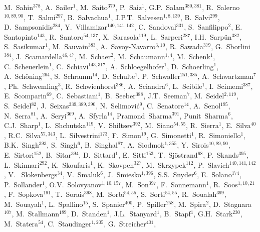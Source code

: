 M.~Sahin$^{{378}}$,
A.~Sailer$^{{1}}$,
M.~Saito$^{{379}}$,
P.~Saiz$^{{1}}$,
G.P.~Salam$^{{380, 381}}$,
R.~Salerno$^{{10, 89, 90}}$,
T.~Salmi$^{{297}}$,
B.~Salvachua$^{{1}}$,
J.P.T.~Salvesen$^{{1, 8, 139}}$,
B.~Salvi$^{{299}}$,
D.~Sampsonidis$^{{284}}$,
Y.~Villamizar$^{{140, 141, 142}}$,
C.~Sandoval$^{{331}}$,
S.~Sanfilippo$^{{2}}$,
E.~ Santopinto$^{{143}}$,
R.~Santoro$^{{54, 137}}$,
X.~Sarasola$^{{119}}$,
L.~Sarperi$^{{287}}$,
I.H.~Sarp{\"u}n$^{{382}}$,
S.~Sasikumar$^{{1}}$,
M.~Sauvain$^{{383}}$,
A.~Savoy-Navarro$^{{3, 10}}$,
R.~Sawada$^{{379}}$,
G.~Sborlini$^{{384}}$,
J.~Scamardella$^{{46, 47}}$,
M.~Schaer$^{{2}}$,
M.~Schaumann$^{{1, 4}}$,
M.~Schenk$^{{1}}$,
C.~Scheuerlein$^{{1}}$,
C.~Schiavi$^{{143, 317}}$,
A.~Schloegelhofer$^{{1}}$,
D.~Schoerling$^{{1}}$,
A.~Sch{\"o}ning$^{{264}}$,
S.~Schramm$^{{14}}$,
D.~Schulte$^{{1}}$,
P.~Schwaller$^{{251, 385}}$,
A.~Schwartzman$^{{7}}$,
Ph.~Schwemling$^{{3}}$,
R.~Schwienhorst$^{{386}}$,
A.~Sciandra$^{{6}}$,
L.~Scibile$^{{1}}$,
I.~Scimemi$^{{387}}$,
E.~Scomparin$^{{69}}$,
C.~Sebastiani$^{{1}}$,
B.~Seeber$^{{388}}$,
J.T.~Seeman$^{{7}}$,
M.~Seidel$^{{2, 119}}$,
S.~Seidel$^{{82}}$,
J.~Seixas$^{{339, 389, 390}}$,
N.~Selimovi{\'c}$^{{9}}$,
C.~Senatore$^{{14}}$,
A.~Senol$^{{195}}$,
N.~Serra$^{{81}}$,
A.~Seryi$^{{369}}$,
A.~Sfyrla$^{{14}}$,
Pramond~Sharma$^{{391}}$,
Punit~Sharma$^{{6}}$,
C.J.~Sharp$^{{1}}$,
L.~Shchutska$^{{119}}$,
V.~Shiltsev$^{{392}}$,
M.~Siano$^{{54, 55}}$,
R.~Sierra$^{{1}}$,
E.~Silva$^{{40}}$,
R.C.~Silva$^{{57, 343}}$,
L.~Silvestrini$^{{173}}$,
F.~Simon$^{{19}}$,
G.~Simonetti$^{{1}}$,
R.~Simoniello$^{{1}}$,
B.K.~Singh$^{{393}}$,
S.~Singh$^{{6}}$,
B.~Singhal$^{{87}}$,
A.~Siodmok$^{{1, 355}}$,
Y.~Sirois$^{{10, 89, 90}}$,
E.~Sirtori$^{{152}}$,
B.~Sitar$^{{394}}$,
D.~Sittard$^{{1}}$,
E.~Sitti$^{{153}}$,
T.~Sj{\"o}strand$^{{68}}$,
P.~Skands$^{{395}}$,
L.~Skinnari$^{{292}}$,
K.~Skoufaris$^{{1}}$,
K.~Skovpen$^{{327}}$,
M.~Skrzypek$^{{112}}$,
P.~Slavich$^{{140, 141, 142}}$,
V.~ Slokenbergs$^{{34}}$,
V.~Smaluk$^{{6}}$,
J.~Smiesko$^{{1, 396}}$,
S.S.~Snyder$^{{6}}$,
E.~Solano$^{{174}}$,
P.~Sollander$^{{1}}$,
O.V.~Solovyanov$^{{1, 10, 157}}$,
M.~Son$^{{397}}$,
F.~Sonnemann$^{{1}}$,
R.~Soos$^{{1, 10, 21}}$,
F.~Sopkova$^{{191}}$,
T.~Sorais$^{{398}}$,
M.~Sorbi$^{{54, 55}}$,
S.~Sorti$^{{54, 55}}$,
R.~Soualah$^{{399}}$,
M.~Souayah$^{{1}}$,
L.~Spallino$^{{15}}$,
S.~Spanier$^{{400}}$,
P.~Spiller$^{{258}}$,
M.~Spira$^{{2}}$,
D.~Stagnara$^{{107}}$,
M.~Stallmann$^{{189}}$,
D.~Standen$^{{1}}$,
J.L.~Stanyard$^{{1}}$,
B.~Stapf$^{{1}}$,
G.H.~Stark$^{{230}}$,
M.~Statera$^{{54}}$,
C.~Staudinger$^{{1, 205}}$,
G.~Streicher$^{{401}}$,
